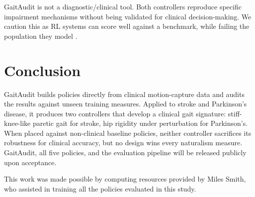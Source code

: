 \documentclass{article}
\begin{document}
GaitAudit is not a diagnostic/clinical tool. Both controllers reproduce specific impairment mechanisms without being validated for clinical decision-making. We caution this as RL systems can score well against a benchmark, while failing the population they model \cite{berger2025benchmark}.

\section{Conclusion}

GaitAudit builds policies directly from clinical motion-capture data and audits the results against unseen training measures. Applied to stroke and Parkinson's disease, it produces two controllers that develop a clinical gait signature: stiff-knee-like paretic gait for stroke, hip rigidity under perturbation for Parkinson's. When placed against non-clinical baseline policies, neither controller sacrifices its robustness for clinical accuracy, but no design wins every naturalism measure. GaitAudit, all five policies, and the evaluation pipeline will be released publicly upon acceptance.
\begin{ack}
This work was made possible by computing resources provided by Miles Smith, who assisted in training all the policies evaluated in this study.
\end{ack}
\end{document}
